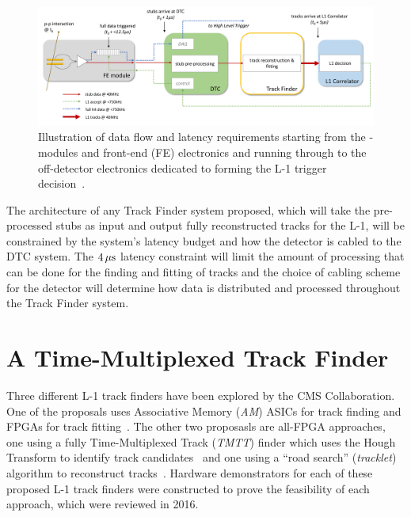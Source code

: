 \begin{figure}[tbp]
\centering
\includegraphics[width=\textwidth]{figs/tk-upgrade/dataflow.pdf}
\caption{Illustration of data flow and latency requirements starting from the \pt-modules and front-end (FE) electronics and running through to the off-detector electronics dedicated to forming the L-1 trigger decision~\cite{TMTT_JINST}.}
\label{fig:dataFlow}
\end{figure}

The architecture of any Track Finder system proposed, which will take the pre-processed stubs as input and output fully reconstructed tracks for the L-1, will be constrained by the system's latency budget and how the detector is cabled to the DTC system.
The $4\,\mu\text{s}$ latency constraint will limit the amount of processing that can be done for the finding and fitting of tracks and the choice of cabling scheme for the detector will determine how data is distributed and processed throughout the Track Finder system.

\section{A Time-Multiplexed Track Finder}\label{sec:TMTT}
Three different L-1 track finders have been explored by the CMS Collaboration.
One of the proposals uses Associative Memory (\emph{AM}) ASICs for track finding and FPGAs for track fitting~\cite{P2TrackerTDR,AM}.
The other two proposasls are all-FPGA approaches, one using a fully Time-Multiplexed Track (\emph{TMTT}) finder which uses the Hough Transform to identify track candidates~\cite{TMTT_JINST} and one using a ``road search'' (\emph{tracklet}) algorithm to reconstruct tracks~\cite{P2TrackerTDR,tracklet}.
Hardware demonstrators for each of these proposed L-1 track finders were constructed to prove the feasibility of each approach, which were reviewed in 2016.

